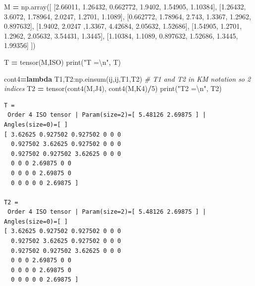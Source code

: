 \documentclass[
  a4paper,
  numbers=noendperiod,
  DIV=12]{scrreprt}
\newenvironment{Shaded}{\begin{snugshade}}{\end{snugshade}}
\newcommand{\BuiltInTok}[1]{#1}
\newcommand{\CharTok}[1]{\textcolor[rgb]{0.31,0.60,0.02}{#1}}
\newcommand{\CommentTok}[1]{\textcolor[rgb]{0.56,0.35,0.01}{\textit{#1}}}
\newcommand{\DecValTok}[1]{\textcolor[rgb]{0.00,0.00,0.81}{#1}}
\newcommand{\FloatTok}[1]{\textcolor[rgb]{0.00,0.00,0.81}{#1}}
\newcommand{\KeywordTok}[1]{\textcolor[rgb]{0.13,0.29,0.53}{\textbf{#1}}}
\newcommand{\NormalTok}[1]{#1}
\newcommand{\OperatorTok}[1]{\textcolor[rgb]{0.81,0.36,0.00}{\textbf{#1}}}
\newcommand{\StringTok}[1]{\textcolor[rgb]{0.31,0.60,0.02}{#1}}
\begin{document}
\begin{Shaded}
\begin{Highlighting}[]
\NormalTok{M }\OperatorTok{=}\NormalTok{ np.array([ [}\FloatTok{2.66011}\NormalTok{, }\FloatTok{1.26432}\NormalTok{, }\FloatTok{0.662772}\NormalTok{, }\FloatTok{1.9402}\NormalTok{, }\FloatTok{1.54905}\NormalTok{, }\FloatTok{1.10384}\NormalTok{],}
\NormalTok{               [}\FloatTok{1.26432}\NormalTok{, }\FloatTok{3.6072}\NormalTok{, }\FloatTok{1.78964}\NormalTok{, }\FloatTok{2.0247}\NormalTok{, }\FloatTok{1.2701}\NormalTok{, }\FloatTok{1.1089}\NormalTok{], }
\NormalTok{               [}\FloatTok{0.662772}\NormalTok{, }\FloatTok{1.78964}\NormalTok{, }\FloatTok{2.743}\NormalTok{, }\FloatTok{1.3367}\NormalTok{, }\FloatTok{1.2962}\NormalTok{, }\FloatTok{0.897632}\NormalTok{], }
\NormalTok{               [}\FloatTok{1.9402}\NormalTok{, }\FloatTok{2.0247}\NormalTok{ ,}\FloatTok{1.3367}\NormalTok{, }\FloatTok{4.42684}\NormalTok{, }\FloatTok{2.05632}\NormalTok{, }\FloatTok{1.52686}\NormalTok{], }
\NormalTok{               [}\FloatTok{1.54905}\NormalTok{, }\FloatTok{1.2701}\NormalTok{, }\FloatTok{1.2962}\NormalTok{, }\FloatTok{2.05632}\NormalTok{, }\FloatTok{3.54431}\NormalTok{, }\FloatTok{1.3445}\NormalTok{], }
\NormalTok{               [}\FloatTok{1.10384}\NormalTok{, }\FloatTok{1.1089}\NormalTok{, }\FloatTok{0.897632}\NormalTok{, }\FloatTok{1.52686}\NormalTok{, }\FloatTok{1.3445}\NormalTok{, }\FloatTok{1.99356}\NormalTok{] ])}

\NormalTok{T }\OperatorTok{=}\NormalTok{ tensor(M,ISO)}
\BuiltInTok{print}\NormalTok{(}\StringTok{"T =}\CharTok{\textbackslash{}n}\StringTok{"}\NormalTok{, T)}

\NormalTok{cont4}\OperatorTok{=}\KeywordTok{lambda}\NormalTok{ T1,T2:np.einsum(}\StringTok{\textquotesingle{}ij,ij\textquotesingle{}}\NormalTok{,T1,T2) }\CommentTok{\# T1 and T2 in KM notation so 2 indices}
\NormalTok{T2 }\OperatorTok{=}\NormalTok{ tensor(cont4(M,J4), cont4(M,K4)}\OperatorTok{/}\DecValTok{5}\NormalTok{)}
\BuiltInTok{print}\NormalTok{(}\StringTok{"T2 =}\CharTok{\textbackslash{}n}\StringTok{"}\NormalTok{, T2)}
\end{Highlighting}
\end{Shaded}

\begin{verbatim}
T =
 Order 4 ISO tensor | Param(size=2)=[ 5.48126 2.69875 ] | Angles(size=0)=[ ]
[ 3.62625 0.927502 0.927502 0 0 0 
  0.927502 3.62625 0.927502 0 0 0 
  0.927502 0.927502 3.62625 0 0 0 
  0 0 0 2.69875 0 0 
  0 0 0 0 2.69875 0 
  0 0 0 0 0 2.69875 ]

T2 =
 Order 4 ISO tensor | Param(size=2)=[ 5.48126 2.69875 ] | Angles(size=0)=[ ]
[ 3.62625 0.927502 0.927502 0 0 0 
  0.927502 3.62625 0.927502 0 0 0 
  0.927502 0.927502 3.62625 0 0 0 
  0 0 0 2.69875 0 0 
  0 0 0 0 2.69875 0 
  0 0 0 0 0 2.69875 ]
\end{verbatim}
\end{document}
